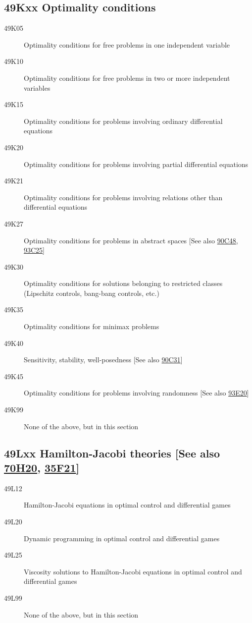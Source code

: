 \subsection*{49Kxx  Optimality conditions }\label{49Kxx}
\begin{description}  
\item [49K05]\label{49K05} Optimality conditions for free problems in one independent variable
\item [49K10]\label{49K10} Optimality conditions for free problems in two or more independent variables
\item [49K15]\label{49K15} Optimality conditions for problems involving ordinary differential equations
\item [49K20]\label{49K20} Optimality conditions for problems involving partial differential equations
\item [49K21]\label{49K21} Optimality conditions for problems involving relations other than differential equations
\item [49K27]\label{49K27} Optimality conditions for problems in abstract spaces [See also \hyperref[90C48]{90C48}, \hyperref[93C25]{93C25}]
\item [49K30]\label{49K30} Optimality conditions for solutions belonging to restricted classes (Lipschitz controls, bang-bang controls, etc.)
\item [49K35]\label{49K35} Optimality conditions for minimax problems
\item [49K40]\label{49K40} Sensitivity, stability, well-posedness [See also \hyperref[90C31]{90C31}]
\item [49K45]\label{49K45} Optimality conditions for problems involving randomness [See also \hyperref[93E20]{93E20}]
\item [49K99]\label{49K99} None of the above, but in this section
\end{description}
\subsection*{49Lxx  Hamilton-Jacobi theories  [See also \hyperref[70H20]{70H20}, \hyperref[35F21]{35F21}] }\label{49Lxx}
\begin{description}  
\item [49L12]\label{49L12} Hamilton-Jacobi equations in optimal control and differential games
\item [49L20]\label{49L20} Dynamic programming in optimal control and differential games
\item [49L25]\label{49L25} Viscosity solutions to Hamilton-Jacobi equations in optimal control and differential games
\item [49L99]\label{49L99} None of the above, but in this section
\end{description}
